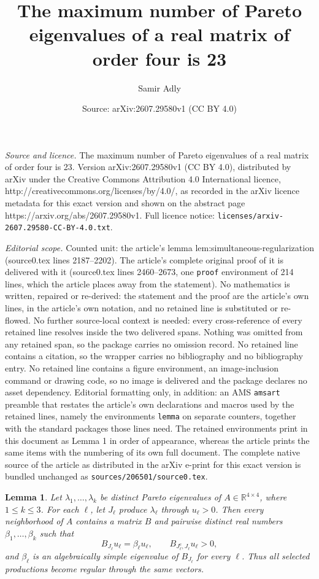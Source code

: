 \documentclass[10pt,a4paper]{amsart}
\title{The maximum number of Pareto eigenvalues of a real matrix of order four is 23}
\author{Samir Adly}
\date{Source: arXiv:2607.29580v1 (CC BY 4.0)}
\newtheorem{lemma}{Lemma}
\newcommand{\R}{\mathbb R}
\begin{document}
\maketitle

\noindent\emph{Source and licence.} The maximum number of Pareto eigenvalues of a real matrix of order four is 23. Version arXiv:2607.29580v1 (CC BY 4.0), distributed by arXiv under the Creative Commons Attribution 4.0 International licence, http://creativecommons.org/licenses/by/4.0/, as recorded in the arXiv licence metadata for this exact version and shown on the abstract page https://arxiv.org/abs/2607.29580v1. Full licence notice: \texttt{licenses/arxiv-2607.29580-CC-BY-4.0.txt}.\par\smallskip

\noindent\textit{Editorial scope.} Counted unit: the article's lemma lem:simultaneous-regularization (source0.tex lines 2187--2202). The article's complete original proof of it is delivered with it (source0.tex lines 2460--2673, one \texttt{proof} environment of 214 lines, which the article places away from the statement). No mathematics is written, repaired or re-derived: the statement and the proof are the article's own lines, in the article's own notation, and no retained line is substituted or re-flowed.  No further source-local context is needed: every cross-reference of every retained line resolves inside the two delivered spans.  Nothing was omitted from any retained span, so the package carries no omission record.  No retained line contains a citation, so the wrapper carries no bibliography and no bibliography entry.  No retained line contains a figure environment, an image-inclusion command or drawing code, so no image is delivered and the package declares no asset dependency.  Editorial formatting only, in addition: an AMS \texttt{amsart} preamble that restates the article's own declarations and macros used by the retained lines, namely the environments \texttt{lemma} on separate counters, together with the standard packages those lines need.  The retained environments print in this document as Lemma 1 in order of appearance, whereas the article prints the same items with the numbering of its own full document.  The complete native source of the article as distributed in the arXiv e-print for this exact version is bundled unchanged as \texttt{sources/206501/source0.tex}.
\begin{lemma}
\label{lem:simultaneous-regularization}
Let $\lambda_1,\ldots,\lambda_k$ be distinct Pareto eigenvalues of
$A\in\R^{4\times4}$, where $1\leq k\leq3$. For each $\ell$, let
$J_\ell$ produce $\lambda_\ell$ through $u_\ell>0$. Then every
neighborhood of $A$ contains a matrix $B$ and pairwise distinct real
numbers $\beta_1,\ldots,\beta_k$ such that
$$
B_{J_\ell}u_\ell=\beta_\ell u_\ell,
\qquad
B_{J_\ell^{\mathrm c},J_\ell}u_\ell>0,
$$
and $\beta_\ell$ is an algebraically simple eigenvalue of
$B_{J_\ell}$ for every $\ell$. Thus all selected productions become
regular through the same vectors.
\end{lemma}
\end{document}
